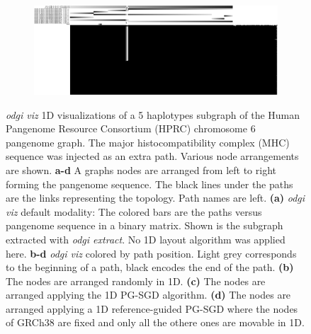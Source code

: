 \begin{figure}[!htpb]
\begin{subfigure}{1.0\textwidth}
		\centering
		\caption{}
		\includegraphics[width=1.0\linewidth, trim=0cm 2.5cm 0cm 0cm]{fig/1D/chr6.hprc-v1.0-pggb.13paths.MHC.og.r.og.HY.og.png}
		\label{fig:1d_fig4}
	\end{subfigure}	
	\caption{\textit{odgi viz} 1D visualizations of a 5 haplotypes subgraph of the Human Pangenome Resource Consortium (HPRC) chromosome 6 pangenome graph. The major histocompatibility complex (MHC) sequence was injected as an extra path. Various node arrangements are shown. 
		\textbf{a-d} A graphs nodes are arranged from left to right forming the pangenome sequence. The black lines under the paths are the links representing the topology. Path names are left.
		\textbf{(a)} \textit{odgi viz} default modality: The colored bars are the paths versus pangenome sequence in a binary matrix. Shown is the subgraph extracted with \textit{odgi extract}. No 1D layout algorithm was applied here.
		\textbf{b-d} \textit{odgi viz} colored by path position. Light grey corresponds to the beginning of a path, black encodes the end of the path.
		\textbf{(b)} The nodes are arranged randomly in 1D.
		\textbf{(c)} The nodes are arranged applying the 1D PG-SGD algorithm.
		\textbf{(d)} The nodes are arranged applying a 1D reference-guided PG-SGD where the nodes of GRCh38 are fixed and only all the othere ones are movable in 1D.}
	\label{fig:1d_sorts}
\end{figure}